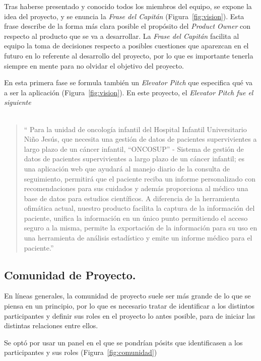 Tras haberse presentado y conocido todos los miembros del equipo, se expone la idea del proyecto, y se enuncia la \emph{Frase del Capitán} (Figura~\ref{fig:vision}). Esta frase describe de la forma más clara posible el propósito del \emph{Product Owner} con respecto al producto que se va a desarrollar. La \emph{Frase del Capitán} facilita al equipo la toma de decisiones respecto a posibles cuestiones que aparezcan en el futuro en lo referente al desarrollo del proyecto, por lo que es importante tenerla siempre en mente para no olvidar el objetivo del proyecto.

En esta primera fase se formula también un \emph{Elevator Pitch} que especifica qué va a ser la aplicación (Figura~\ref{fig:vision}). En este proyecto, el \emph{Elevator Pitch fue el siguiente}
\\
\\
\begin{quote}
{\huge ``} Para la unidad de oncología infantil del Hospital Infantil Universitario Niño Jesús, que necesita una gestión de datos de pacientes supervivientes a largo plazo de un cáncer infantil, ``ONCOSUP'' - Sistema de gestión de datos de pacientes supervivientes a largo plazo de un cáncer infantil; es una aplicación web que ayudará al manejo diario de la consulta de seguimiento, permitirá que el paciente reciba un informe personalizado con recomendaciones para sus cuidados y además proporciona al médico una base de datos para estudios científicos. A diferencia de la herramienta ofimática actual, nuestro producto facilita la captura de la información del paciente, unifica la información en un único punto permitiendo el acceso seguro a la misma, permite la exportación de la información para su uso en una herramienta de análisis estadístico y emite un informe médico para el paciente.{\huge ''}
\end{quote}

\subsection{Comunidad de Proyecto.}
\label{subsec:comunidad}


En líneas generales, la comunidad de proyecto suele ser más grande de lo que se piensa en un principio, por lo que es necesario tratar de identificar a los distintos participantes y definir sus roles en el proyecto lo antes posible, para de iniciar las distintas relaciones entre ellos.

Se optó por usar un panel en el que se pondrían pósits que identificasen a los participantes y sus roles (Figura~\ref{fig:comunidad})

